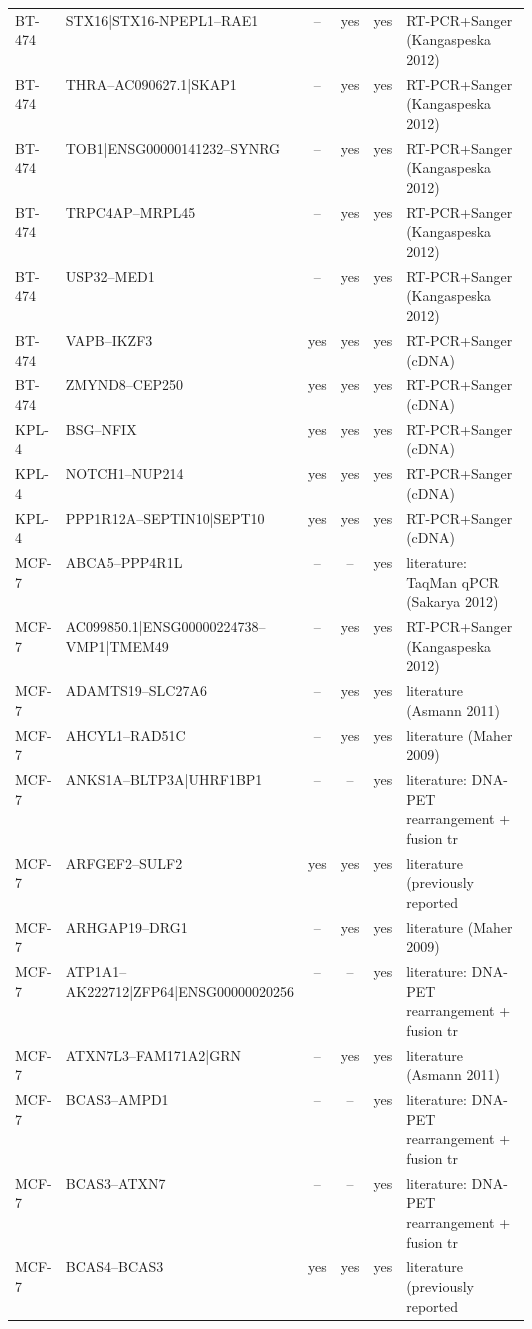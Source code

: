 {\begin{longtable}{lp{0.30\linewidth}cccp{0.30\linewidth}}
BT-474 & STX16|STX16-NPEPL1--RAE1 & -- & yes & yes & RT-PCR+Sanger (Kangaspeska 2012) \\
BT-474 & THRA--AC090627.1|SKAP1 & -- & yes & yes & RT-PCR+Sanger (Kangaspeska 2012) \\
BT-474 & TOB1|ENSG00000141232--SYNRG & -- & yes & yes & RT-PCR+Sanger (Kangaspeska 2012) \\
BT-474 & TRPC4AP--MRPL45 & -- & yes & yes & RT-PCR+Sanger (Kangaspeska 2012) \\
BT-474 & USP32--MED1 & -- & yes & yes & RT-PCR+Sanger (Kangaspeska 2012) \\
BT-474 & VAPB--IKZF3 & yes & yes & yes & RT-PCR+Sanger (cDNA) \\
BT-474 & ZMYND8--CEP250 & yes & yes & yes & RT-PCR+Sanger (cDNA) \\
KPL-4 & BSG--NFIX & yes & yes & yes & RT-PCR+Sanger (cDNA) \\
KPL-4 & NOTCH1--NUP214 & yes & yes & yes & RT-PCR+Sanger (cDNA) \\
KPL-4 & PPP1R12A--SEPTIN10|SEPT10 & yes & yes & yes & RT-PCR+Sanger (cDNA) \\
MCF-7 & ABCA5--PPP4R1L & -- & -- & yes & literature: TaqMan qPCR (Sakarya 2012) \\
MCF-7 & AC099850.1|ENSG00000224738--VMP1|TMEM49 & -- & yes & yes & RT-PCR+Sanger (Kangaspeska 2012) \\
MCF-7 & ADAMTS19--SLC27A6 & -- & yes & yes & literature (Asmann 2011) \\
MCF-7 & AHCYL1--RAD51C & -- & yes & yes & literature (Maher 2009) \\
MCF-7 & ANKS1A--BLTP3A|UHRF1BP1 & -- & -- & yes & literature: DNA-PET rearrangement + fusion tr \\
MCF-7 & ARFGEF2--SULF2 & yes & yes & yes & literature (previously reported \\
MCF-7 & ARHGAP19--DRG1 & -- & yes & yes & literature (Maher 2009) \\
MCF-7 & ATP1A1--AK222712|ZFP64|ENSG00000020256 & -- & -- & yes & literature: DNA-PET rearrangement + fusion tr \\
MCF-7 & ATXN7L3--FAM171A2|GRN & -- & yes & yes & literature (Asmann 2011) \\
MCF-7 & BCAS3--AMPD1 & -- & -- & yes & literature: DNA-PET rearrangement + fusion tr \\
MCF-7 & BCAS3--ATXN7 & -- & -- & yes & literature: DNA-PET rearrangement + fusion tr \\
MCF-7 & BCAS4--BCAS3 & yes & yes & yes & literature (previously reported \\

\end{longtable}}
